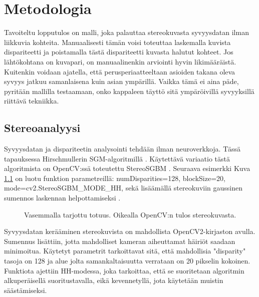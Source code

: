 \chapter{Metodologia}
\label{ch:metodologia}

Tavoiteltu lopputulos on malli, joka palauttaa stereokuvasta syvyysdatan ilman liikkuvia kohteita.
Manuaalisesti tämän voisi toteuttaa laskemalla kuvista dispariteetti ja poistamalla tästä dispariteetti kuvasta halutut kohteet.
Jos lähtökohtana on kuvapari, on manuaalinenkin arviointi hyvin likimääräistä. Kuitenkin voidaan ajatella, että perusperiaatteeltaan asioiden takana oleva syvyys jatkuu samanlaisena kuin asian ympärillä.
Vaikka tämä ei aina päde, pyritään mallilla testaamaan, onko kappaleen täyttö sitä ympäröivillä syvyyksillä riittävä tekniikka.

\section{Stereoanalyysi}

Syvyysdatan ja dispariteetin analysointi tehdään ilman neuroverkkoja.
Tässä tapauksessa Hirschmullerin SGM-algoritmillä \cite{hirschmuller2005babel}.
Käytettävä variaatio tästä algoritmista on OpenCV:ssä toteutettu StereoSGBM \cite{opencvsgbm}.
Seuraava esimerkki Kuva \ref{fig:disparity1} on luotu funktion parametreillä: numDisparities=128, blockSize=20, mode=cv2.StereoSGBM\_MODE\_HH,
sekä lisäämällä stereokuviin gaussinen sumennos laskennan helpottamiseksi \cite{AnShiyong2021Asvs}.

\begin{figure}[h]
\centering
{}
\caption[Tämä on lyhyt kuvateksti.]{Vasemmalla tarjottu totuus. Oikealla OpenCV:n tulos stereokuvasta.}
\label{fig:disparity1}
\end{figure}
    
Syvyysdatan kerääminen stereokuvista on mahdollista OpenCV2-kirjaston avulla.
Sumennus lisättiin, jotta mahdolliset kameran aiheuttamat häiriöt saadaan minimoitua.
Käytetyt parametrit tarkoittavat sitä, että mahdollisia "disparity" tasoja on 128 ja alue jolta samankaltaisuutta verrataan on 20 pikselin kokoinen.
Funktiota ajettiin HH-modessa, joka tarkoittaa, että se suoritetaan algoritmin alkuperäisellä suoritustavalla, 
eikä kevennetyllä, jota käytetään muistin säästämiseksi.

